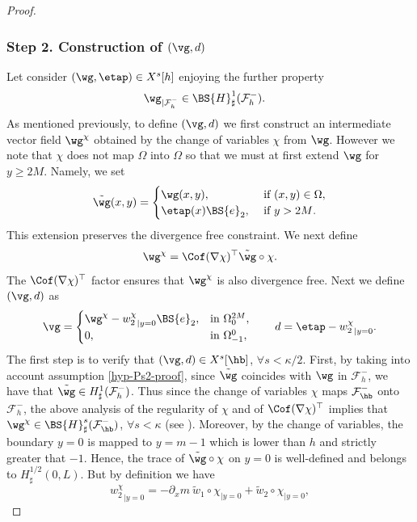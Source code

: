 \begin{proof}
\subsubsection*{Step 2. Construction of $(\vg,d)$}
Let consider $(\wg,\etap) \in X^s[h]$ enjoying the further property
\begin{eqnarray}
&\wg_{\vert\mathcal{F}_{h}^{-}}\in \BS{H}^{1}_{\sharp}(\mathcal{F}^{-}_{h}).\label{hyp-Ps2-proof}
\end{eqnarray}
As mentioned previously, to define $(\vg,d)$ we first construct an intermediate vector field
$\wg^{\chi}$ obtained by the change of variables $\chi$ from $\wg$. However we note that
$\chi$ does not map $\Omega$ into $\Omega$ so that we must at first extend $\wg$ for
$y\geq 2 M$. Namely, we set
\[
\tilde{\wg}(x,y) =
\begin{cases}
\wg(x,y), & \text{ if $(x,y) \in \Omega$}, \\
\etap(x)\BS{e}_{2}, & \text{ if $y >2M$}.
\end{cases}
\]
This extension preserves the divergence free constraint.
We next define
\[\wg^\chi = \Cof(\nabla \chi)^{\top}\tilde{\wg}\circ \chi.\]
The $\Cof(\nabla \chi)^{\top}$ factor ensures that $\wg^\chi$ is also divergence free.
Next we define $(\vg,d)$ as
\begin{equation}\label{def.v.b}
\vg=\begin{cases}
\wg^\chi -{w_{2}^\chi}_{|{y=0}}\BS{e}_{2}, & \text{in } \Omega^{2M}_{0},\\
0, & \text{in }\Omega^{0}_{-1},
\end{cases}
\qquad
d=\etap -{w_{2}^\chi}_{|{y=0}}.
\end{equation}
The first step is to verify that $(\vg, d) \in X^s[\hb]$, $\forall s<\kappa/2$. First, by taking into account assumption \eqref{hyp-Ps2-proof}, since $\tilde{\wg}$ coincides with $\wg$ in $\mathcal F_{h}^{-}$, we have that $\tilde{\wg}\in H_\sharp^1(\mathcal F_{h}^{-})$. Thus since the change of variables $\chi$ maps $\mathcal{F}^-_{\hb}$ onto $\mathcal{F}^-_{h}$, the above analysis of the regularity of $\chi$ and of $ \Cof(\nabla \chi)^{\top}$ implies that $\wg^\chi\in \BS{H}^s_\sharp(\mathcal{F}^-_{\hb})$, $\forall s<\kappa$ (see \cite[Prop.\,B.1]{Grubsolo} ). Moreover, by the change of variables, the boundary $y=0$ is mapped to $y= m-1 $ which is lower than $h$ and strictly greater that $-1$. Hence, the trace of $\tilde{\wg} \circ \chi$ on $y=0$ is well-defined and belongs to $ H^{1/2}_{\sharp}(0,L)$.
But by definition we have
\[
{w_{2}^\chi}_{|{y=0}} = -\partial_x m \ \tilde{w}_{1}\circ\chi_{|{y=0}}+\tilde{w}_{2}\circ\chi_{|{y=0}},
\]
\end{proof}
